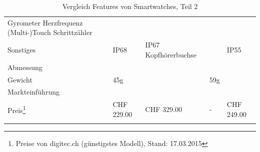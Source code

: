 \begin{landscape}
\begin{longtable}{p{2.8cm}p{3.5cm}p{3.5cm}p{3.5cm}p{3.5cm}p{3.5cm}}
			Gyrometer \newline
			Herzfrequenz \newline
			(Multi-)Touch \newline
			Schrittzähler \\
	Sonstiges
		&
		& IP68
		& IP67 \newline
			Kopfhörerbuchse
		&
		& IP55\\
	Abmessung
		\\
	Gewicht
		&
		& 45g
		&
		& 59g
		& \\ 
	Markteinführung
		\\
	Preis\footnote{Preise von digitec.ch (günstigstes Modell), Stand: 17.03.2015}
		&		
		& CHF 229.00
		& CHF 329.00
		& -
		& CHF 249.00\\
	\hline
	\caption{Vergleich Features von Smartwatches, Teil 2} \\
	
\end{longtable}
\end{landscape}
